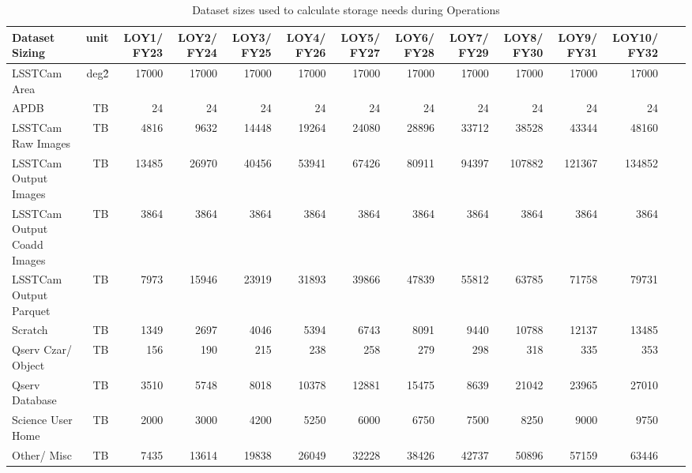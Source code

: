 \tiny \begin{longtable} { |p{}  |r  |r  |r  |r  |r  |r  |r  |r  |r  |r  |r  |r  |r |} 
\caption{Dataset sizes used to calculate storage needs during Operations \label{tab:datasetSizingOps}}\\ 
\hline 
\textbf{Dataset Sizing}&\textbf{unit}&\textbf{LOY1/ FY23}&\textbf{LOY2/ FY24}&\textbf{LOY3/ FY25}&\textbf{LOY4/ FY26}&\textbf{LOY5/ FY27}&\textbf{LOY6/ FY28}&\textbf{LOY7/ FY29}&\textbf{LOY8/ FY30}&\textbf{LOY9/ FY31}&\textbf{LOY10/ FY32}& \\ \hline
{LSSTCam Area}&{deg\^2}&{17000}&{17000}&{17000}&{17000}&{17000}&{17000}&{17000}&{17000}&{17000}&{17000}& \\ \hline
{APDB}&{TB}&{24}&{24}&{24}&{24}&{24}&{24}&{24}&{24}&{24}&{24}& \\ \hline
{LSSTCam Raw Images}&{TB}&{4816}&{9632}&{14448}&{19264}&{24080}&{28896}&{33712}&{38528}&{43344}&{48160}& \\ \hline
{LSSTCam Output Images}&{TB}&{13485}&{26970}&{40456}&{53941}&{67426}&{80911}&{94397}&{107882}&{121367}&{134852}& \\ \hline
{LSSTCam Output Coadd Images}&{TB}&{3864}&{3864}&{3864}&{3864}&{3864}&{3864}&{3864}&{3864}&{3864}&{3864}& \\ \hline
{LSSTCam Output Parquet}&{TB}&{7973}&{15946}&{23919}&{31893}&{39866}&{47839}&{55812}&{63785}&{71758}&{79731}& \\ \hline
{Scratch}&{TB}&{1349}&{2697}&{4046}&{5394}&{6743}&{8091}&{9440}&{10788}&{12137}&{13485}& \\ \hline
{Qserv Czar/ Object}&{TB}&{156}&{190}&{215}&{238}&{258}&{279}&{298}&{318}&{335}&{353}& \\ \hline
{Qserv Database}&{TB}&{3510}&{5748}&{8018}&{10378}&{12881}&{15475}&{8639}&{21042}&{23965}&{27010}& \\ \hline
{Science User Home}&{TB}&{2000}&{3000}&{4200}&{5250}&{6000}&{6750}&{7500}&{8250}&{9000}&{9750}& \\ \hline
{Other/ Misc}&{TB}&{7435}&{13614}&{19838}&{26049}&{32228}&{38426}&{42737}&{50896}&{57159}&{63446}& \\ \hline
\end{longtable} \normalsize
